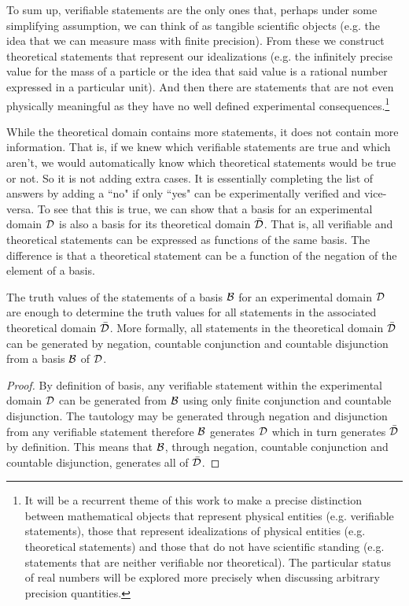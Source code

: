 \documentclass[11pt,letterpaper,fleqn]{memoir} %
\begin{document}
To sum up, verifiable statements are the only ones that, perhaps under some simplifying assumption, we can think of as tangible scientific objects (e.g. the idea that we can measure mass with finite precision). From these we construct theoretical statements that represent our idealizations (e.g. the infinitely precise value for the mass of a particle or the idea that said value is a rational number expressed in a particular unit). And then there are statements that are not even physically meaningful as they have no well defined experimental consequences.\footnote{It will be a recurrent theme of this work to make a precise distinction between mathematical objects that represent physical entities (e.g. verifiable statements), those that represent idealizations of physical entities (e.g. theoretical statements) and those that do not have scientific standing (e.g. statements that are neither verifiable nor theoretical). The particular status of real numbers will be explored more precisely when discussing arbitrary precision quantities.}

While the theoretical domain contains more statements, it does not contain more information. That is, if we knew which verifiable statements are true and which aren't, we would automatically know which theoretical statements would be true or not. So it is not adding extra cases. It is essentially completing the list of answers by adding a ``no" if only ``yes" can be experimentally verified and vice-versa. To see that this is true, we can show that a basis for an experimental domain $\mathcal{D}$ is also a basis for its theoretical domain $\bar{\mathcal{D}}$. That is, all verifiable and theoretical statements can be expressed as functions of the same basis. The difference is that a theoretical statement can be a function of the negation of the element of a basis.

\begin{mathSection}
\begin{prop}
	The truth values of the statements of a basis $\mathcal{B}$ for an experimental domain $\mathcal{D}$ are enough to determine the truth values for all statements in the associated theoretical domain $\bar{\mathcal{D}}$. More formally, all statements in the theoretical domain $\bar{\mathcal{D}}$ can be generated by negation, countable conjunction and countable disjunction from a basis $\mathcal{B}$ of $\mathcal{D}$.
\end{prop}

\begin{proof}
	By definition of basis, any verifiable statement within the experimental domain $\mathcal{D}$ can be generated from $\mathcal{B}$ using only finite conjunction and countable disjunction. The tautology may be generated through negation and disjunction from any verifiable statement therefore $\mathcal{B}$ generates $\mathcal{D}$ which in turn generates $\bar{\mathcal{D}}$ by definition. This means that $\mathcal{B}$, through negation, countable conjunction and countable disjunction, generates all of $\bar{\mathcal{D}}$.
\end{proof}
\end{mathSection}
\end{document}
